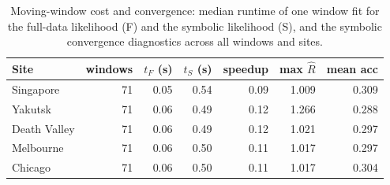 \begin{table}[t]
\centering
\small
\caption{Moving-window cost and convergence: median runtime of one window fit for the full-data likelihood (F) and the symbolic likelihood (S), and the symbolic convergence diagnostics across all windows and sites.}
\label{tab:real-runtime}
\begin{tabular}{lrrrrrr}
\toprule
Site & windows & $t_F$ (s) & $t_S$ (s) & speedup & max $\hat R$ & mean acc \\
\midrule
Singapore &   71 & 0.05 & 0.54 & 0.09 & 1.009 & 0.309 \\
Yakutsk &   71 & 0.06 & 0.49 & 0.12 & 1.266 & 0.288 \\
Death Valley &   71 & 0.06 & 0.49 & 0.12 & 1.021 & 0.297 \\
Melbourne &   71 & 0.06 & 0.50 & 0.11 & 1.017 & 0.297 \\
Chicago &   71 & 0.06 & 0.50 & 0.11 & 1.017 & 0.304 \\
\bottomrule
\end{tabular}
\end{table}
